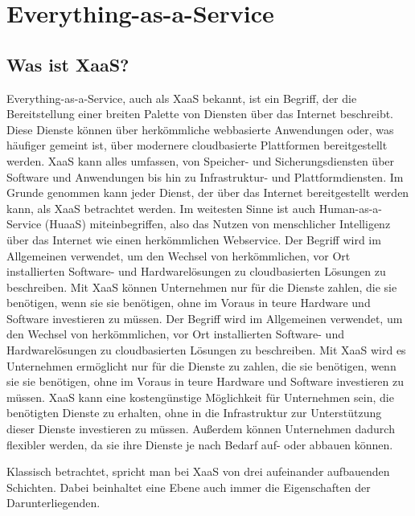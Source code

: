 \section{Everything-as-a-Service}
\subsection{Was ist XaaS?}
Everything-as-a-Service, auch als XaaS bekannt, ist ein Begriff, der die Bereitstellung einer breiten Palette von Diensten über das Internet beschreibt. Diese Dienste können über herkömmliche webbasierte Anwendungen oder, was häufiger gemeint ist, über modernere cloudbasierte Plattformen bereitgestellt werden. XaaS kann alles umfassen, von Speicher- und Sicherungsdiensten über Software und Anwendungen bis hin zu Infrastruktur- und Plattformdiensten. \cite[vgl.][986f.]{Kollmann.2020} Im Grunde genommen kann jeder Dienst, der über das Internet bereitgestellt werden kann, als XaaS betrachtet werden. Im weitesten Sinne ist auch Human-as-a-Service (HuaaS) miteinbegriffen, also das Nutzen von menschlicher Intelligenz über das Internet wie einen herkömmlichen Webservice. \cite[vgl.][]{CW.2022}
Der Begriff wird im Allgemeinen verwendet, um den Wechsel von herkömmlichen, vor Ort installierten Software- und Hardwarelösungen zu cloudbasierten Lösungen zu beschreiben. Mit XaaS können Unternehmen nur für die Dienste zahlen, die sie benötigen, wenn sie sie benötigen, ohne im Voraus in teure Hardware und Software investieren zu müssen. Der Begriff wird im Allgemeinen verwendet, um den Wechsel von herkömmlichen, vor Ort installierten Software- und Hardwarelösungen zu cloudbasierten Lösungen zu beschreiben. Mit XaaS wird es Unternehmen ermöglicht nur für die Dienste zu zahlen, die sie benötigen, wenn sie sie benötigen, ohne im Voraus in teure Hardware und Software investieren zu müssen. XaaS kann eine kostengünstige Möglichkeit für Unternehmen sein, die benötigten Dienste zu erhalten, ohne in die Infrastruktur zur Unterstützung dieser Dienste investieren zu müssen. Außerdem können Unternehmen dadurch flexibler werden, da sie ihre Dienste je nach Bedarf auf- oder abbauen können.

Klassisch betrachtet, spricht man bei XaaS von drei aufeinander aufbauenden Schichten. Dabei beinhaltet eine Ebene auch immer die Eigenschaften der Darunterliegenden.

